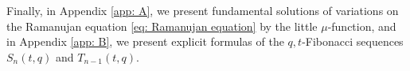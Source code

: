 \documentclass[a4paper]{article}
\numberwithin{equation}{section}
\theoremstyle{plain}
\newtheorem{thm}{Theorem}
\begin{document}

Finally, in Appendix \ref{app: A}, we present fundamental solutions of variations on the Ramanujan equation \eqref{eq: Ramanujan equation} by the little $\mu$-function,
and in Appendix \ref{app: B}, we present explicit formulas of the $q,t$-Fibonacci sequences $S_n(t,q)$ and $T_{n-1}(t,q)$. 
\end{document}
